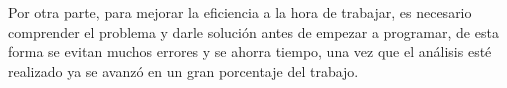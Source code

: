 \documentclass{article}
\begin{document}
\vspace{5mm}

Por otra parte, para mejorar la eficiencia a la hora de trabajar, es necesario comprender el problema y darle solución antes de empezar a programar, de esta forma se evitan muchos errores y se ahorra tiempo, una vez que el análisis esté realizado ya se avanzó en un gran porcentaje del trabajo.
\end{document}
